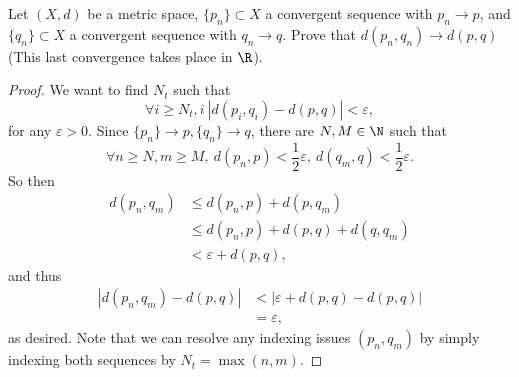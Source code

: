 \documentclass{assignment}
\begin{document}
\begin{question}[2]
  Let $(X, d)$ be a metric space, $\{p_n\} \subset X$ a convergent sequence with $p_n \to p$, and 
  $\{q_n\} \subset X$ a convergent sequence with $q_n \to q$. Prove that $d(p_n, q_n) \to d(p, q)$
  (This last convergence takes place in $\R$).
\end{question}
\begin{proof}
  We want to find $N_t$ such that $$\forall i \geq N_t,i\ |d(p_i, q_i) - d(p, q)| < \varepsilon,$$ for
  any $\varepsilon > 0$.
  Since $\{p_n\}\to p, \{q_n\}\to q$, there are $N, M \in \N$ such that $$\forall n \geq N,
  m \geq M,\ d(p_n, p) < \frac{1}{2}\varepsilon,\ d(q_m, q) < \frac{1}{2}\varepsilon.$$ So then
  \begin{align*}
    d(p_n, q_m) &\leq d(p_n, p) + d(p, q_m) \\
                &\leq d(p_n, p) + d(p,q) + d(q, q_m) \\
                &< \varepsilon + d(p,q),
  \end{align*}
  and thus 
  \begin{align*}
    |d(p_n, q_m) - d(p,q)| &< |\varepsilon + d(p,q) - d(p,q)| \\
                           &= \varepsilon,
  \end{align*}
  as desired. Note that we can resolve any indexing issues $(p_n, q_m)$ by simply indexing both sequences
  by $N_t = \max(n,m)$.
\end{proof}
\end{document}
